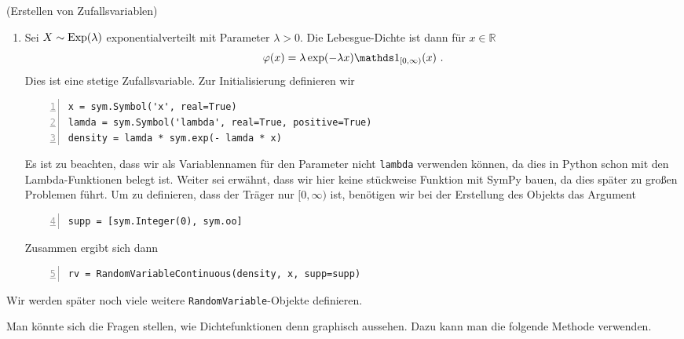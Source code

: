 \begin{Beispiel}{(Erstellen von Zufallsvariablen)}
\begin{enumerate}[label=(\roman*)]
\item Sei $X \sim \operatorname{Exp}(\lambda)$ exponentialverteilt mit Parameter $\lambda > 0$. Die Lebesgue-Dichte ist dann für $x \in \mathbb{R}$
\[\varphi(x) = \lambda \exp(- \lambda x) \indi_{[0, \infty)}(x)~.\]
Dies ist eine stetige Zufallsvariable. Zur Initialisierung definieren wir
\begin{lstlisting}[numbers=left, numberstyle=\tiny\color{codegray}]
x = sym.Symbol('x', real=True)
lamda = sym.Symbol('lambda', real=True, positive=True)
density = lamda * sym.exp(- lamda * x)
\end{lstlisting}
Es ist zu beachten, dass wir als Variablennamen für den Parameter nicht \lstinline|lambda| verwenden können, da dies in Python schon mit den Lambda-Funktionen belegt ist. Weiter sei erwähnt, dass wir hier keine stückweise Funktion mit SymPy bauen, da dies später zu großen Problemen führt. Um zu definieren, dass der Träger nur $[0, \infty)$ ist, benötigen wir bei der Erstellung des Objekts das Argument
\begin{lstlisting}[numbers=left, numberstyle=\tiny\color{codegray}, firstnumber=4]
supp = [sym.Integer(0), sym.oo]
\end{lstlisting}
Zusammen ergibt sich dann
\begin{lstlisting}[numbers=left, numberstyle=\tiny\color{codegray}, firstnumber=5]
rv = RandomVariableContinuous(density, x, supp=supp)
\end{lstlisting}
\end{enumerate}
\vspace*{-\medskipamount}
Wir werden später noch viele weitere \lstinline|RandomVariable|-Objekte definieren.
\end{Beispiel}

Man könnte sich die Fragen stellen, wie Dichtefunktionen denn graphisch aussehen. Dazu kann man die folgende Methode verwenden.

